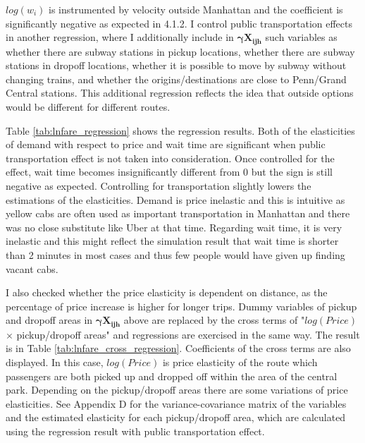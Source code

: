 \indent $log(w_{i})$ is instrumented by velocity outside Manhattan and the coefficient is significantly negative as expected in 4.1.2. I control public transportation effects in another regression, where I additionally include in $\mathbf{\bm{\gamma} X_{ijh}}$ such variables as whether there are subway stations in pickup locations, whether there are subway stations in dropoff locations, whether it is possible to move by subway without changing trains, and whether the origins/destinations are close to Penn/Grand Central stations. This additional regression reflects the idea that outside options would be different for different routes.



\indent Table \ref{tab:lnfare_regression} shows the regression results. Both of the elasticities of demand with respect to price and wait time are significant when public transportation effect is not taken into consideration. Once controlled for the effect, wait time becomes insignificantly different from 0 but the sign is still negative as expected. Controlling for transportation slightly lowers the estimations of the elasticities. Demand is price inelastic and this is intuitive as yellow cabs are often used as important transportation in Manhattan and there was no close substitute like Uber at that time. Regarding wait time, it is very inelastic and this might reflect the simulation result that wait time is shorter than 2 minutes in most cases and thus few people would have given up finding vacant cabs.

\indent I also checked whether the price elasticity is dependent on distance, as the percentage of price increase is higher for longer trips. Dummy variables of pickup and dropoff areas in $\mathbf{\bm{\gamma} X_{ijh}}$ above are replaced by the cross terms of "$log (Price)$ $\times$ pickup/dropoff areas" and regressions are exercised in the same way. The result is in Table \ref{tab:lnfare_cross_regression}. Coefficients of the cross terms are also displayed. In this case, $log (Price)$ is price elasticity of the route which passengers are both picked up and dropped off within the area of the central park. Depending on the pickup/dropoff areas there are some variations of price elasticities. See Appendix D for the variance-covariance matrix of the variables and the estimated elasticity for each pickup/dropoff area, which are calculated using the regression result with public transportation effect.

